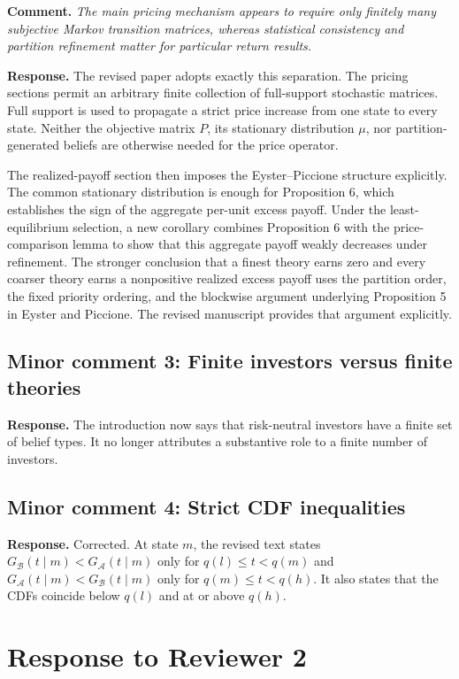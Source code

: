 \documentclass[11pt]{article}
\newcommand{\commenttext}[1]{\par\noindent\textbf{Comment.} \textit{#1}\par}
\newcommand{\response}[1]{\par\noindent\textbf{Response.} #1\par}
\begin{document}
\commenttext{The main pricing mechanism appears to require only finitely many subjective Markov transition matrices, whereas statistical consistency and partition refinement matter for particular return results.}

\response{The revised paper adopts exactly this separation. The pricing sections permit an arbitrary finite collection of full-support stochastic matrices. Full support is used to propagate a strict price increase from one state to every state. Neither the objective matrix $P$, its stationary distribution $\mu$, nor partition-generated beliefs are otherwise needed for the price operator.

The realized-payoff section then imposes the Eyster--Piccione structure explicitly. The common stationary distribution is enough for Proposition 6, which establishes the sign of the aggregate per-unit excess payoff. Under the least-equilibrium selection, a new corollary combines Proposition 6 with the price-comparison lemma to show that this aggregate payoff weakly decreases under refinement. The stronger conclusion that a finest theory earns zero and every coarser theory earns a nonpositive realized excess payoff uses the partition order, the fixed priority ordering, and the blockwise argument underlying Proposition 5 in Eyster and Piccione. The revised manuscript provides that argument explicitly.}

\subsection*{Minor comment 3: Finite investors versus finite theories}

\response{The introduction now says that risk-neutral investors have a finite set of belief types. It no longer attributes a substantive role to a finite number of investors.}

\subsection*{Minor comment 4: Strict CDF inequalities}

\response{Corrected. At state $m$, the revised text states $G_{\mathcal B}(t\mid m)<G_{\mathcal A}(t\mid m)$ only for $q(l)\leq t<q(m)$ and $G_{\mathcal A}(t\mid m)<G_{\mathcal B}(t\mid m)$ only for $q(m)\leq t<q(h)$. It also states that the CDFs coincide below $q(l)$ and at or above $q(h)$.}

\section*{Response to Reviewer 2}
\end{document}
